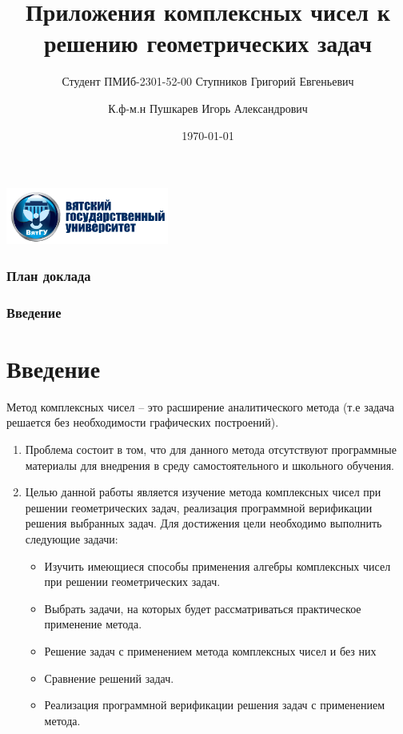 \documentclass{beamer}
\title[]{Приложения комплексных чисел к решению геометрических задач}
\institute[]{ФГБОУ ВО «Вятский государственный университет»}
\date{\today}
\author[ ]{Студент ПМИб-2301-52-00 Ступников Григорий Евгеньевич \and К.ф-м.н Пушкарев Игорь Александрович}
\newcommand\frametitleSpec[1]{%
\frametitle{#1}
\section{#1}%
}
\begin{document}
\begin{frame}
    \centering\includegraphics[width=0.4\textwidth]{images/vyatsu_logo.png}\\
    \titlepage
\end{frame}
\begin{frame}
    \frametitle{План доклада}

    \tableofcontents

\end{frame}
\begin{frame}
    \frametitleSpec{Введение}
    Метод комплексных чисел -- это расширение аналитического метода (т.е задача решается без необходимости графических построений).
    \begin{enumerate}
        \item Проблема состоит в том, что для данного метода отсутствуют программные материалы для внедрения в среду самостоятельного и школьного обучения.
        \item Целью данной работы является изучение метода комплексных чисел при решении геометрических задач, реализация программной верификации решения выбранных задач. Для достижения цели необходимо выполнить следующие задачи:
              \begin{itemize}
                  \item Изучить имеющиеся способы применения алгебры комплексных чисел при решении геометрических задач.
                  \item Выбрать задачи, на которых будет рассматриваться практическое применение метода.
                  \item Решение задач с применением метода комплексных чисел и без них
                  \item Сравнение решений задач.
                  \item Реализация программной верификации решения задач с применением метода.
              \end{itemize}
    \end{enumerate}

\end{frame}
\end{document}
